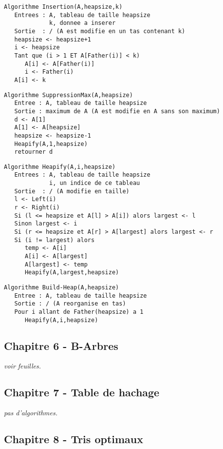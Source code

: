 \documentclass{article}
\begin{document}
\begin{lstlisting}
Algorithme Insertion(A,heapsize,k)
   Entrees : A, tableau de taille heapsize
             k, donnee a inserer
   Sortie  : / (A est modifie en un tas contenant k)
   heapsize <- heapsize+1
   i <- heapsize
   Tant que (i > 1 ET A[Father(i)] < k)
      A[i] <- A[Father(i)]
      i <- Father(i)
   A[i] <- k
\end{lstlisting}

\begin{lstlisting}
Algorithme SuppressionMax(A,heapsize)
   Entree : A, tableau de taille heapsize
   Sortie : maximum de A (A est modifie en A sans son maximum)
   d <- A[1]
   A[1] <- A[heapsize]
   heapsize <- heapsize-1
   Heapify(A,1,heapsize)
   retourner d
\end{lstlisting}

\begin{lstlisting}
Algorithme Heapify(A,i,heapsize)
   Entrees : A, tableau de taille heapsize
             i, un indice de ce tableau
   Sortie  : / (A modifie en taille)
   l <- Left(i)
   r <- Right(i)
   Si (l <= heapsize et A[l] > A[i]) alors largest <- l
   Sinon largest <- i
   Si (r <= heapsize et A[r] > A[largest] alors largest <- r
   Si (i != largest) alors
      temp <- A[i]
      A[i] <- A[largest]
      A[largest] <- temp
      Heapify(A,largest,heapsize)
\end{lstlisting}

\begin{lstlisting}
Algorithme Build-Heap(A,heapsize)
   Entree : A, tableau de taille heapsize
   Sortie : / (A reorganise en tas)
   Pour i allant de Father(heapsize) a 1
      Heapify(A,i,heapsize)
\end{lstlisting}

\subsection{Chapitre 6 - B-Arbres}

\textit{voir feuilles.}

\subsection{Chapitre 7 - Table de hachage}

\textit{pas d'algorithmes.}
\newpage
\subsection{Chapitre 8 - Tris optimaux}
\end{document}
